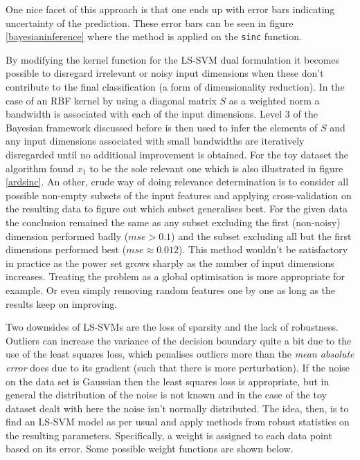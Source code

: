 One nice facet of this approach is that one ends up with error bars indicating uncertainty of the prediction. These error bars can be seen in figure \ref{bayesianinference} where the method is applied on the \texttt{sinc} function.


By modifying the kernel function for the LS-SVM dual formulation it becomes possible to disregard irrelevant or noisy input dimensions when these don't contribute to the final classification (a form of dimensionality reduction). In the case of an RBF kernel by using a diagonal matrix $S$ as a weighted norm a bandwidth is associated with each of the input dimensions. Level 3 of the Bayesian framework discussed before is then used to infer the elements of $S$ and any input dimensions associated with small bandwidths are iteratively disregarded until no additional improvement is obtained. For the toy dataset the algorithm found $x_1$ to be the sole relevant one which is also illustrated in figure \ref{ardsinc}. An other, crude way of doing relevance determination is to consider all possible non-empty subsets of the input features and applying cross-validation on the resulting data to figure out which subset generalises best. For the given data the conclusion remained the same as any subset excluding the first (non-noisy) dimension performed badly ($mse>0.1$) and the subset excluding all but the first dimensions performed best ($mse\approx 0.012$). This method wouldn't be satisfactory in practice as the power set grows sharply as the number of input dimensions increases. Treating the problem as a global optimisation is more appropriate for example. Or even simply removing random features one by one as long as the results keep on improving.


Two downsides of LS-SVMs are the loss of sparsity and the lack of robustness. Outliers can increase the variance of the decision boundary quite a bit due to the use of the least squares loss, which penalises outliers more than the \textit{mean absolute error} does due to its gradient (such that there is more perturbation). If the noise on the data set is Gaussian then the least squares loss is appropriate, but in general the distribution of the noise is not known and in the case of the toy dataset dealt with here the noise isn't normally distributed. The idea, then, is to find an LS-SVM model as per usual and apply methods from robust statistics on the resulting parameters. Specifically, a weight is assigned to each data point based on its error. Some possible weight functions are shown below. 

